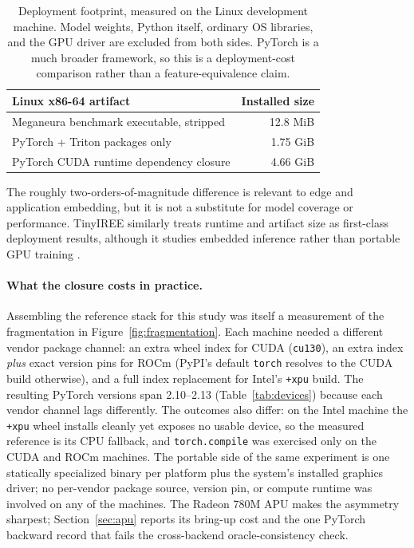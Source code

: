 \documentclass[10pt,twocolumn]{article}
\newcommand{\system}{Meganeura}
\newcommand{\code}[1]{\texttt{#1}}
\begin{document}
\begin{table}[t]
\centering
\small
\begin{tabularx}{\columnwidth}{Xr}
\toprule
Linux x86-64 artifact & Installed size \\
\midrule
\system{} benchmark executable, stripped & 12.8 MiB \\
PyTorch + Triton packages only & 1.75 GiB \\
PyTorch CUDA runtime dependency closure & 4.66 GiB \\
\bottomrule
\end{tabularx}
\caption{Deployment footprint, measured on the Linux development machine.
Model weights, Python itself, ordinary OS libraries, and the GPU driver are
excluded from both sides. PyTorch is a much broader framework, so this is a
deployment-cost comparison rather than a feature-equivalence claim.}
\label{tab:footprint}
\end{table}

The roughly two-orders-of-magnitude difference is relevant to edge and
application embedding, but it is not a substitute for model coverage or
performance. TinyIREE similarly treats runtime and artifact size as
first-class deployment results, although it studies embedded inference
rather than portable GPU training \cite{liu2022tinyiree}.

\paragraph{What the closure costs in practice.}
Assembling the reference stack for this study was itself a measurement of
the fragmentation in Figure~\ref{fig:fragmentation}. Each machine needed a
different vendor package channel: an extra wheel index for CUDA
(\code{cu130}), an extra index \emph{plus} exact version pins for ROCm
(PyPI's default \code{torch} resolves to the CUDA build otherwise), and a
full index replacement for Intel's \code{+xpu} build. The resulting PyTorch
versions span 2.10--2.13 (Table~\ref{tab:devices}) because each vendor
channel lags differently. The outcomes also differ: on the Intel machine the
\code{+xpu} wheel installs cleanly yet exposes no usable device, so the
measured reference is its CPU fallback, and \code{torch.compile} was
exercised only on the CUDA and ROCm machines. The portable side of the same
experiment is one statically specialized binary per platform plus the
system's installed graphics driver; no per-vendor package source, version
pin, or compute runtime was involved on any of the machines. The Radeon
780M APU makes the asymmetry sharpest; Section~\ref{sec:apu} reports its
bring-up cost and the one PyTorch backward record that fails the
cross-backend oracle-consistency check.
\end{document}
